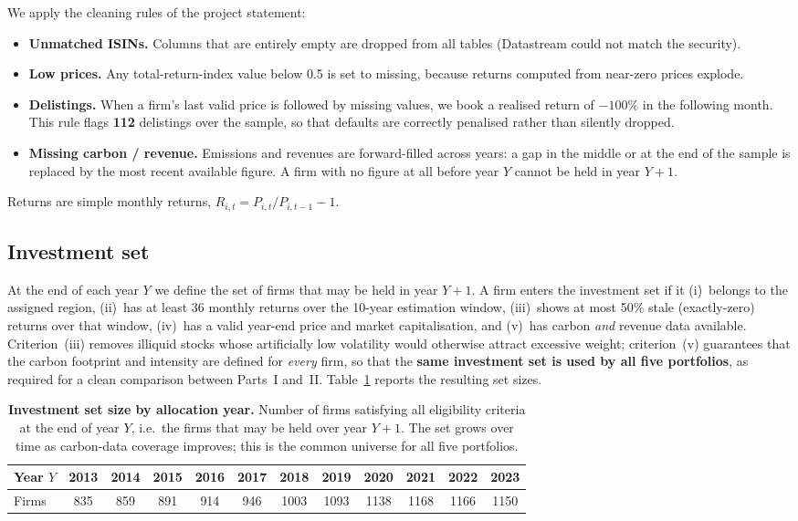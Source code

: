 \documentclass[11pt,a4paper]{article}
\begin{document}
We apply the cleaning rules of the project statement:
\begin{itemize}[nosep,leftmargin=1.3em]
  \item \textbf{Unmatched ISINs.} Columns that are entirely empty are dropped
        from all tables (Datastream could not match the security).
  \item \textbf{Low prices.} Any total-return-index value below 0.5 is set to
        missing, because returns computed from near-zero prices explode.
  \item \textbf{Delistings.} When a firm's last valid price is followed by
        missing values, we book a realised return of $-100\%$ in the
        following month. This rule flags \textbf{112} delistings over the
        sample, so that defaults are correctly penalised rather than silently
        dropped.
  \item \textbf{Missing carbon / revenue.} Emissions and revenues are
        forward-filled across years: a gap in the middle or at the end of the
        sample is replaced by the most recent available figure. A firm with no
        figure at all before year $Y$ cannot be held in year $Y+1$.
\end{itemize}
Returns are simple monthly returns, $R_{i,t}=P_{i,t}/P_{i,t-1}-1$.

\subsection{Investment set}

At the end of each year $Y$ we define the set of firms that may be held in
year $Y+1$. A firm enters the investment set if it (i)~belongs to the assigned
region, (ii)~has at least 36 monthly returns over the 10-year estimation
window, (iii)~shows at most 50\% stale (exactly-zero) returns over that window,
(iv)~has a valid year-end price and market capitalisation, and (v)~has carbon
\emph{and} revenue data available. Criterion~(iii) removes illiquid stocks
whose artificially low volatility would otherwise attract excessive weight;
criterion~(v) guarantees that the carbon footprint and intensity are defined
for \emph{every} firm, so that the \textbf{same investment set is used by all
five portfolios}, as required for a clean comparison between Parts~I and~II.
Table~\ref{tab:set} reports the resulting set sizes.

\begin{table}[H]
\centering
\caption{\textbf{Investment set size by allocation year.} Number of firms
satisfying all eligibility criteria at the end of year $Y$, i.e.\ the firms that
may be held over year $Y+1$. The set grows over time as carbon-data coverage
improves; this is the common universe for all five portfolios.}
\label{tab:set}
\small
\begin{tabular}{lccccccccccc}
\toprule
Year $Y$ & 2013 & 2014 & 2015 & 2016 & 2017 & 2018 & 2019 & 2020 & 2021 & 2022 & 2023\\
\midrule
Firms & 835 & 859 & 891 & 914 & 946 & 1003 & 1093 & 1138 & 1168 & 1166 & 1150\\
\bottomrule
\end{tabular}
\end{table}
\end{document}
